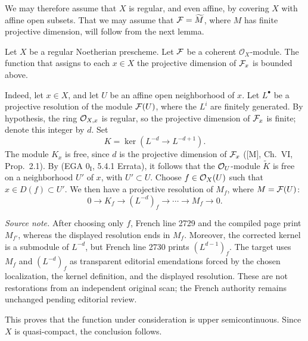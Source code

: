 We may therefore assume that $X$ is regular, and even affine, by covering
$X$ with affine open subsets. That we may assume that $\cF=\widetilde M$, where
$M$ has finite projective dimension, will follow from the next lemma.

\begin{lemma}\label{VIII.2.4}
Let $X$ be a regular Noetherian prescheme. Let $\cF$ be a coherent
$\mathcal O_X$-module. The function that assigns to each $x\in X$ the
projective dimension of $\cF_x$ is bounded above.
\end{lemma}


\setcounter{equation}{1}
\medskip
Indeed, let $x\in X$, and let $U$ be an affine open neighborhood of $x$.
Let $L^\bullet$ be a projective resolution of the module $\cF(U)$, where the
$L^i$ are finitely generated. By hypothesis, the ring $\mathcal O_{X,x}$ is regular,
so the projective dimension of $\cF_x$ is finite; denote this integer by $d$.
Set
\[
  K=\ker(L^{-d}\longrightarrow L^{-d+1}).
\]
The module $K_x$ is free, since $d$ is the projective dimension of $\cF_x$
([M], Ch.~VI, Prop.~2.1). By (EGA $0_{\mathrm I}$, 5.4.1 Errata), it follows
that the $\mathcal O_U$-module $\widetilde K$ is free on a neighborhood $U'$ of $x$,
with $U'\subset U$. Choose $f\in\mathcal O_X(U)$ such that
$x\in D(f)\subset U'$. We then have a projective resolution of $M_f$, where
$M=\cF(U)$:
\[
  0\longrightarrow K_f\longrightarrow (L^{-d})_f\longrightarrow
  \cdots\longrightarrow M_f\longrightarrow 0.
\]

\noindent\emph{Source note.} After choosing only $f$, French line 2729 and
the compiled page print $M_{f'}$, whereas the displayed resolution ends in
$M_f$. Moreover, the corrected kernel is a submodule of $L^{-d}$, but French
line 2730 prints $(L^{d-1})_f$. The target uses $M_f$ and $(L^{-d})_f$ as
transparent editorial emendations forced by the chosen localization, the
kernel definition, and the displayed resolution. These are not restorations
from an independent original scan; the French authority remains unchanged
pending editorial review.

This proves that the function under consideration is upper semicontinuous.
Since $X$ is quasi-compact, the conclusion follows.


